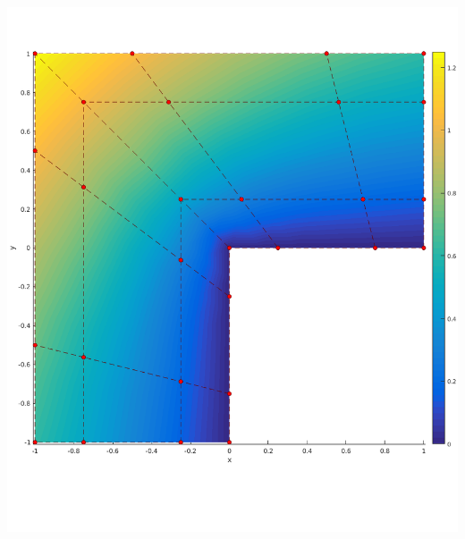 \documentclass{beamer}
\begin{document}
\begin{frame}
\begin{minipage}{0.49\textwidth}
		\includegraphics[scale=0.24]{pics/lshape/lshape_controlnet_1.png}
	\end{minipage}
\end{frame}
\end{document}
